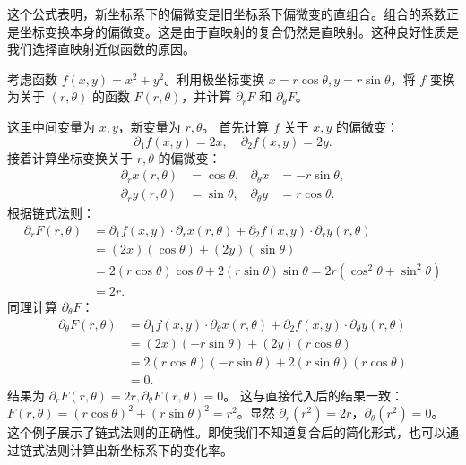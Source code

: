 \documentclass[12pt,UTF8,fontset=none]{ctexbook}
\begin{document}
这个公式表明，新坐标系下的偏微变是旧坐标系下偏微变的直组合。组合的系数正是坐标变换本身的偏微变。这是由于直映射的复合仍然是直映射。这种良好性质是我们选择直映射近似函数的原因。

\begin{et}
考虑函数 $f(x, y) = x^2 + y^2$。利用极坐标变换 $x = r \cos \theta, y = r \sin \theta$，将 $f$ 变换为关于 $(r, \theta)$ 的函数 $F(r, \theta)$，并计算 $\partial_r F$ 和 $\partial_\theta F$。
\end{et}
\begin{so}
这里中间变量为 $x, y$，新变量为 $r, \theta$。
首先计算 $f$ 关于 $x, y$ 的偏微变：
$$ \partial_1 f(x, y) = 2x, \quad \partial_2 f(x, y) = 2y. $$
接着计算坐标变换关于 $r, \theta$ 的偏微变：
\begin{align*}
\partial_r x(r,\theta) &= \cos \theta, & \partial_\theta x &= -r \sin \theta, \\
\partial_r y(r,\theta) &= \sin \theta, & \partial_\theta y &= r \cos \theta.
\end{align*}
根据链式法则：
\begin{align*}
\partial_r F(r,\theta) &= \partial_1 f(x, y) \cdot \partial_r x(r,\theta) + \partial_2 f(x, y) \cdot \partial_r y(r,\theta) \\
&= (2x)(\cos \theta) + (2y)(\sin \theta) \\
&= 2(r \cos \theta)\cos \theta + 2(r \sin \theta)\sin \theta = 2r (\cos^2 \theta + \sin^2 \theta) \\
&= 2r.
\end{align*}
同理计算 $\partial_\theta F$：
\begin{align*}
\partial_\theta F(r,\theta) &= \partial_1 f(x, y) \cdot \partial_\theta x(r,\theta) + \partial_2 f(x, y) \cdot \partial_\theta y(r,\theta) \\
&= (2x)(-r \sin \theta) + (2y)(r \cos \theta) \\
&= 2(r \cos \theta)(-r \sin \theta) + 2(r \sin \theta)(r \cos \theta) \\
&= 0.
\end{align*}
结果为 $\partial_r F(r,\theta) = 2r, \partial_\theta F(r,\theta) = 0$。
这与直接代入后的结果一致：$F(r, \theta) = (r \cos \theta)^2 + (r \sin \theta)^2 = r^2$。显然 $\partial_r (r^2) = 2r$，$\partial_\theta (r^2) = 0$。
这个例子展示了链式法则的正确性。即使我们不知道复合后的简化形式，也可以通过链式法则计算出新坐标系下的变化率。
\end{so}
\end{document}
